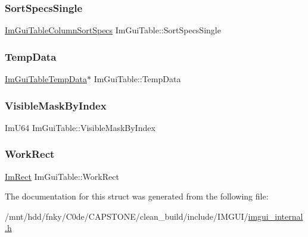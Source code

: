 \mbox{\label{structImGuiTable_ad111a9b0073e5061f2a847e9ad99519f}} 
\subsubsection{\texorpdfstring{Sort\+Specs\+Single}{SortSpecsSingle}}
{\footnotesize\ttfamily \hyperlink{structImGuiTableColumnSortSpecs}{Im\+Gui\+Table\+Column\+Sort\+Specs} Im\+Gui\+Table\+::\+Sort\+Specs\+Single}

\mbox{\label{structImGuiTable_a89db69966920e938cdf67f23164c3a80}} 
\subsubsection{\texorpdfstring{Temp\+Data}{TempData}}
{\footnotesize\ttfamily \hyperlink{structImGuiTableTempData}{Im\+Gui\+Table\+Temp\+Data}$\ast$ Im\+Gui\+Table\+::\+Temp\+Data}

\mbox{\label{structImGuiTable_a7c13f14fa0933b15a4430123f49acb05}} 
\subsubsection{\texorpdfstring{Visible\+Mask\+By\+Index}{VisibleMaskByIndex}}
{\footnotesize\ttfamily Im\+U64 Im\+Gui\+Table\+::\+Visible\+Mask\+By\+Index}

\mbox{\label{structImGuiTable_a4e0fd51349a7bedc8321f3977ff9e48c}} 
\subsubsection{\texorpdfstring{Work\+Rect}{WorkRect}}
{\footnotesize\ttfamily \hyperlink{structImRect}{Im\+Rect} Im\+Gui\+Table\+::\+Work\+Rect}



The documentation for this struct was generated from the following file\+:\begin{DoxyCompactItemize}
\item 
/mnt/hdd/fnky/\+C0de/\+C\+A\+P\+S\+T\+O\+N\+E/clean\+\_\+build/include/\+I\+M\+G\+U\+I/\hyperlink{imgui__internal_8h}{imgui\+\_\+internal.\+h}\end{DoxyCompactItemize}
